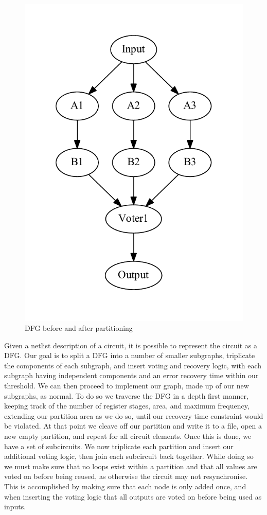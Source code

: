 \documentclass[12pt,final,oneside]{dwThesis} %
\begin{document}
\begin{figure}
\begin{center}
        \includegraphics[height=0.2\textheight]{images/TMR-post.pdf}
        \caption{\ac{DFG} before and after partitioning}
        \label{TMRFigure}
    \end{center}
\end{figure}
Given a netlist description of a circuit, it is possible to represent the circuit as a \ac{DFG}\cite{FPGAArch}. Our goal is to split a \ac{DFG} into a number of smaller subgraphs, triplicate the components of each subgraph, and insert voting and recovery logic, with each subgraph having independent components and an error recovery time within our threshold. We can then proceed to implement our graph, made up of our new subgraphs, as normal.
To do so we traverse the \ac{DFG} in a depth first manner, keeping track of the number of register stages, area, and maximum frequency, extending our partition area as we do so, until our recovery time constraint would be violated.
At that point we cleave off our partition and write it to a file, open a new empty partition, and repeat for all circuit elements.
Once this is done, we have a set of subcircuits. We now triplicate each partition and insert our additional voting logic, then join each subcircuit back together. While doing so we must make sure that no loops exist within a partition and that all values are voted on before being reused, as otherwise the circuit may not resynchronise. This is accomplished by making sure that each node is only added once, and when inserting the voting logic that all outputs are voted on before being used as inputs.
\end{document}
